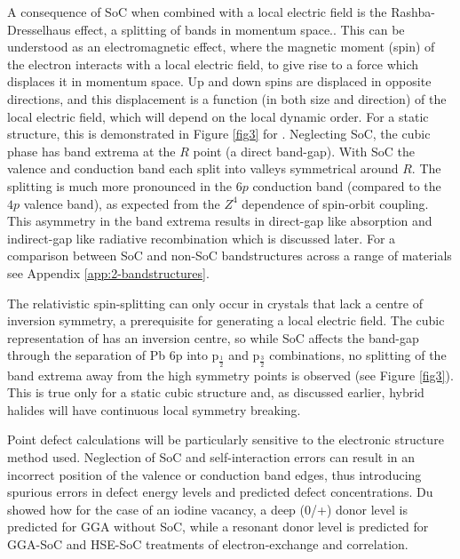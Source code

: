 A consequence of SoC when combined with a local electric field is the Rashba-Dresselhaus effect, a splitting of bands in momentum space.\autocite{Kepenekian2015}.
This can be understood as an electromagnetic effect, where the magnetic moment (spin) of the electron interacts with a local electric field, to give rise to a force which displaces it in momentum space. 
Up and down spins are displaced in opposite directions, and this displacement is a function (in both size and direction) of the local electric field, which will depend on the local dynamic order. 
For a static structure, this is demonstrated in Figure \ref{fig3} for . 
Neglecting SoC, the cubic phase has band extrema at the $R$ point (a direct band-gap).
With SoC the valence and conduction band each split into valleys symmetrical around $R$.
The splitting is much more pronounced in the  $6p$ conduction band (compared to the  $4p$ valence band), as expected from the $Z^4$ dependence of spin-orbit coupling.
This asymmetry in the band extrema results in direct-gap like absorption and indirect-gap like radiative recombination which is discussed later.
For a comparison between SoC and non-SoC bandstructures across a range of materials see Appendix \ref{app:2-bandstructures}.

The relativistic spin-splitting can only occur in crystals that lack a centre of inversion symmetry, a prerequisite for generating a local electric field. 
The cubic representation of  has an inversion centre, so while SoC affects the band-gap through the separation of Pb 6p into p$_{\frac{1}{2}}$ and  p$_{\frac{3}{2}}$ combinations,
no splitting of the band extrema away from the high symmetry points is observed (see Figure \ref{fig3}).
This is true only for a static cubic structure and, as discussed earlier, hybrid halides will have continuous local symmetry breaking. 


Point defect calculations will be particularly sensitive to the electronic structure method used.
Neglection of SoC and self-interaction errors can result in an incorrect position of the valence or conduction band edges, thus introducing spurious errors in defect energy levels and predicted defect concentrations.
Du\autocite{Du2015} showed how for the case of an iodine vacancy, a deep (0/+) donor level is predicted for GGA without SoC,
while a resonant donor level is predicted for GGA-SoC and HSE-SoC treatments of electron-exchange and correlation.

